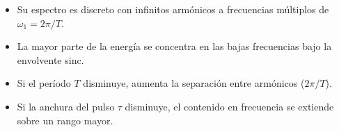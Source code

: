 \begin{tcolorbox}[cajaResumen, title={Propiedades del Tren de Pulsos}]
\begin{itemize}[leftmargin=*]
    \item Su espectro es discreto con infinitos armónicos a frecuencias múltiplos de $\omega_1 = 2\pi/T$.
    \item La mayor parte de la energía se concentra en las bajas frecuencias bajo la envolvente sinc.
    \item Si el período $T$ disminuye, aumenta la separación entre armónicos ($2\pi/T$).
    \item Si la anchura del pulso $\tau$ disminuye, el contenido en frecuencia se extiende sobre un rango mayor.
\end{itemize}
\end{tcolorbox}

\newpage

